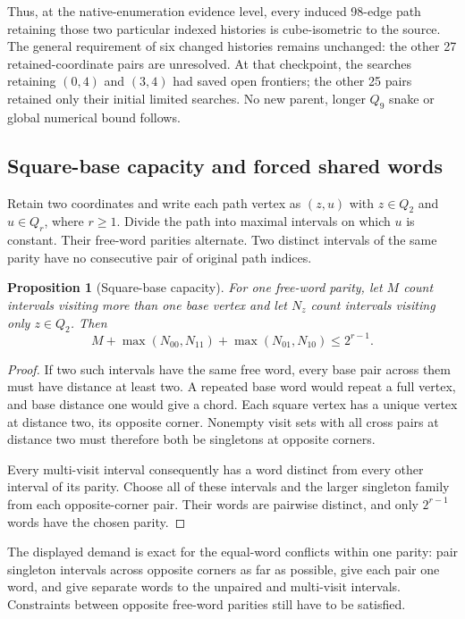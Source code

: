 \documentclass[11pt,a4paper]{article}
\newtheorem{proposition}[theorem]{Proposition}
\theoremstyle{definition}
\theoremstyle{remark}
\begin{document}
Thus, at the native-enumeration evidence level, every induced 98-edge
path retaining those two particular indexed histories is cube-isometric
to the source. The general requirement of six changed histories remains
unchanged: the other 27 retained-coordinate pairs are unresolved.
At that checkpoint, the searches retaining $(0,4)$ and $(3,4)$ had
saved open frontiers; the other 25 pairs retained only their initial
limited searches. No new
parent, longer $Q_9$ snake or global numerical bound follows.


\subsection{Square-base capacity and forced shared words}
\label{sec:capacity209}
Retain two coordinates and write each path vertex as $(z,u)$ with
$z\in Q_2$ and $u\in Q_r$, where $r\ge1$. Divide the path into maximal
intervals on which $u$ is constant. Their free-word parities alternate.
Two distinct intervals of the same parity have no consecutive pair
of original path indices.

\begin{proposition}[Square-base capacity]
For one free-word parity, let $M$ count intervals visiting more than
one base vertex and let $N_z$ count intervals visiting only $z\in Q_2$.
Then
\[
M+\max(N_{00},N_{11})+\max(N_{01},N_{10})\le 2^{r-1}.
\]
\end{proposition}
\begin{proof}
If two such intervals have the same free word, every base pair across
them must have distance at least two. A repeated base word would repeat
a full vertex, and base distance one would give a chord. Each square
vertex has a unique vertex at distance two, its opposite corner.
Nonempty visit sets with all cross pairs at distance two must therefore
both be singletons at opposite corners.

Every multi-visit interval consequently has a word distinct from every
other interval of its parity. Choose all of these intervals and the
larger singleton family from each opposite-corner pair. Their words
are pairwise distinct, and only $2^{r-1}$ words have the chosen parity.
\end{proof}

The displayed demand is exact for the equal-word conflicts within
one parity: pair singleton intervals across opposite corners as far
as possible, give each pair one word, and give separate words to the
unpaired and multi-visit intervals. Constraints between opposite
free-word parities still have to be satisfied.
\end{document}

